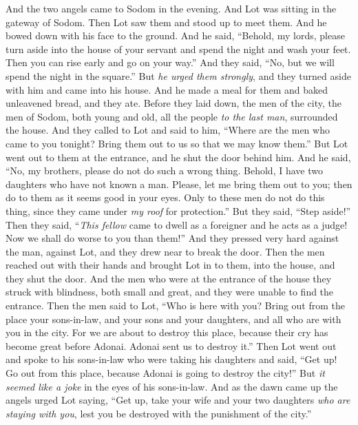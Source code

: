 \begin{biblechapter} %
 And the two angels came to Sodom in the evening. And Lot was sitting in the gateway of Sodom. Then Lot saw them and stood up to meet them. And he bowed down with his face to the ground.
\verse And he said, “Behold, my lords, please turn aside into the house of your servant and spend the night and wash your feet. Then you can rise early and go on your way.” And they said, “No, but we will spend the night in the square.”
\verse But \textit{he urged them strongly}, and they turned aside with him and came into his house. And he made a meal for them and baked unleavened bread, and they ate.
\verse Before they laid down, the men of the city, the men of Sodom, both young and old, all the people \textit{to the last man}, surrounded the house.
\verse And they called to Lot and said to him, “Where are the men who came to you tonight? Bring them out to us so that we may know them.”
\verse But Lot went out to them at the entrance, and he shut the door behind him.
\verse And he said, “No, my brothers, please do not do such a wrong thing.
\verse Behold, I have two daughters who have not known a man. Please, let me bring them out to you; then do to them as it seems good in your eyes. Only to these men do not do this thing, since they came under\textit{ my roof} for protection.”
\verse But they said, “Step aside!” Then they said, “\textit{This fellow} came to dwell as a foreigner and he acts as a judge! Now we shall do worse to you than them!” And they pressed very hard against the man, against Lot, and they drew near to break the door.
\verse Then the men reached out with their hands and brought Lot in to them, into the house, and they shut the door.
\verse And the men who were at the entrance of the house they struck with blindness, both small and great, and they were unable to find the entrance.
\verse Then the men said to Lot, “Who is here with you? Bring out from the place your sons-in-law, and your sons and your daughters, and all who are with you in the city.
\verse For we are about to destroy this place, because their cry has become great before Adonai. Adonai sent us to destroy it.”
\verse Then Lot went out and spoke to his sons-in-law who were taking his daughters and said, “Get up! Go out from this place, because Adonai is going to destroy the city!” But \textit{it seemed like a joke} in the eyes of his sons-in-law.
\verse And as the dawn came up the angels urged Lot saying, “Get up, take your wife and your two daughters \textit{who are staying with you}, lest you be destroyed with the punishment of the city.”

\end{biblechapter}
